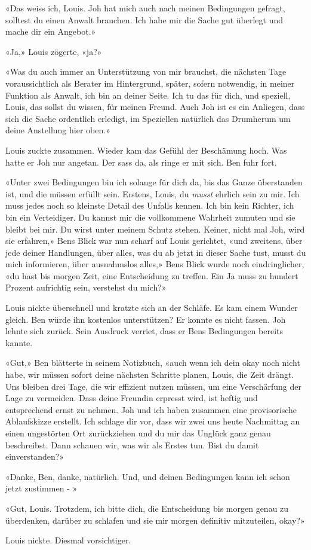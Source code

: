 «Das weiss ich, Louis. Joh hat mich auch nach meinen Bedingungen
gefragt, solltest du einen Anwalt brauchen. Ich habe mir die Sache gut
überlegt und mache dir ein Angebot.»

«Ja,» Louis zögerte, «ja?»

«Was du auch immer an Unterstützung von mir brauchst, die nächsten Tage
voraussichtlich als Berater im Hintergrund, später, sofern notwendig, in
meiner Funktion als Anwalt, ich bin an deiner Seite. Ich tu das für
dich, und speziell, Louis, das sollst du wissen, für meinen Freund. Auch
Joh ist es ein Anliegen, dass sich die Sache ordentlich erledigt, im
Speziellen natürlich das Drumherum um deine Anstellung hier oben.»

Louis zuckte zusammen. Wieder kam das Gefühl der Beschämung hoch. Was
hatte er Joh nur angetan. Der sass da, als ringe er mit sich. 
Ben fuhr fort.

«Unter zwei Bedingungen bin ich solange für dich da, bis das Ganze
überstanden ist, und die müssen erfüllt sein. Erstens, Louis, du
\emph{musst} ehrlich sein zu mir. Ich muss jedes noch so kleinste Detail
des Unfalls kennen. Ich bin kein Richter, ich bin ein Verteidiger. Du
kannst mir die vollkommene Wahrheit zumuten und sie bleibt bei mir. Du
wirst unter meinem Schutz stehen. Keiner, nicht mal Joh, wird sie
erfahren,» Bens Blick war nun scharf auf Louis gerichtet, «und zweitens,
über jede deiner Handlungen, über alles, was du ab jetzt in dieser Sache
tust, musst du mich informieren, über ausnahmslos alles,» Bens Blick
wurde noch eindringlicher, «du hast bis morgen Zeit, eine Entscheidung
zu treffen. Ein Ja muss zu hundert Prozent aufrichtig sein, verstehst du
mich?»

Louis nickte überschnell und kratzte sich an
der Schläfe. Es kam einem Wunder gleich. Ben würde ihn kostenlos
unterstützen? Er konnte es nicht fassen.
Joh lehnte sich zurück. Sein Ausdruck verriet, dass er Bens Bedingungen bereits kannte.


«Gut,» Ben blätterte in seinem Notizbuch, «auch wenn ich dein okay noch
nicht habe, wir müssen sofort deine nächsten Schritte planen, Louis, die
Zeit drängt. Uns bleiben drei Tage, die wir effizient nutzen müssen, um
eine Verschärfung der Lage zu vermeiden. Dass deine Freundin erpresst wird, 
ist heftig und entsprechend ernst zu nehmen. Joh und ich haben zusammen eine provisorische
Ablaufskizze erstellt. Ich schlage dir vor, dass wir zwei uns heute
Nachmittag an einen ungestörten Ort zurückziehen und du mir das Unglück
ganz genau beschreibst. Dann schauen wir, was wir als Erstes tun. Bist
du damit einverstanden?»

«Danke, Ben, danke, natürlich. Und, und deinen Bedingungen kann ich
schon jetzt zustimmen - »

«Gut, Louis. Trotzdem, ich bitte dich, die Entscheidung bis morgen genau
zu überdenken, darüber zu schlafen und sie mir morgen definitiv
mitzuteilen, okay?»

Louis nickte. Diesmal vorsichtiger.
